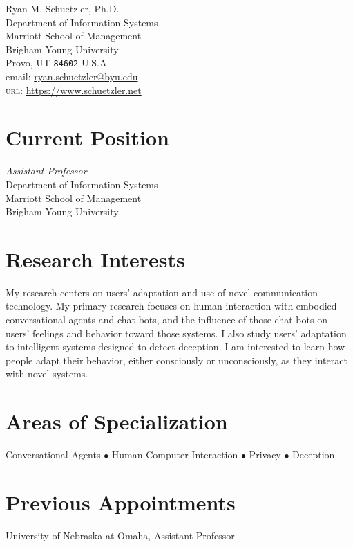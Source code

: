 \documentclass[10pt, letter]{article}
\newcommand{\years}[1]{\marginnote{\scriptsize #1}}
\begin{document}
{\LARGE Ryan M. Schuetzler, Ph.D.}\\[1cm]
Department of Information Systems\\
Marriott School of Management\\
Brigham Young University\\
Provo, UT \texttt{84602}
U.S.A.\\[.2cm]
email: \href{mailto:ryan.schuetzler@byu.edu}{ryan.schuetzler@byu.edu}\\
\textsc{url}: \href{https://www.schuetzler.net}{https://www.schuetzler.net}\\

\section*{Current Position}
\emph{Assistant Professor}\\
Department of Information Systems\\
Marriott School of Management\\
Brigham Young University


\section*{Research Interests}

My research centers on users' adaptation and use of novel communication technology. 
My primary research focuses on human interaction with embodied conversational agents and chat bots, and the influence of those chat bots on users' feelings and behavior toward those systems. 
I also study users' adaptation to intelligent systems designed to detect deception. 
I am interested to learn how people adapt their behavior, either consciously or unconsciously, as they interact with novel systems. 


\section*{Areas of Specialization}
Conversational Agents $\bullet$ Human-Computer Interaction $\bullet$ Privacy $\bullet$ Deception

\section*{Previous Appointments}
\noindent
\years{2015-2020}University of Nebraska at Omaha, Assistant Professor\\
\end{document}
